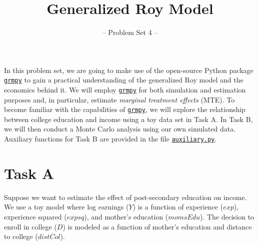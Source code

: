 

\title{Generalized Roy Model}
\subtitle{-- Problem Set 4 --}
\date{}

\maketitle\vspace{-2cm}

In this problem set, we are going to make use of the open-source Python package \href{https://github.com/OpenSourceEconomics/grmpy}{\texttt{grmpy}} to gain a practical understanding of the generalized Roy model and the economics behind it. We will employ \href{https://github.com/OpenSourceEconomics/grmpy}{\texttt{grmpy}} for both simulation and estimation purposes and, in particular, estimate \emph{marginal treatment effects} (MTE). To become familiar with the capabilities of \href{https://github.com/OpenSourceEconomics/grmpy}{\texttt{grmpy}}, we will explore the relationship between college education and income using a toy data set in Task A. 
In Task B, we will then conduct a Monte Carlo analysis using our own simulated data. Auxiliary functions for Task B are provided in the file \href{https://github.com/HumanCapitalAnalysis/microeconometrics/blob/master/problem-sets/04-generalized-roy-model/sources/auxiliary.py}{\texttt{auxiliary.py}}.

\section*{Task A} 

Suppose we want to estimate the effect of post-secondary education on income. We use a toy model where log earnings ($Y$) is a function of experience ($exp$), experience squared ($expsq$), and mother's education ($momsEdu$). The decision to enroll in college ($D$) is modeled as a function of mother's education and distance to college ($distCol$).



